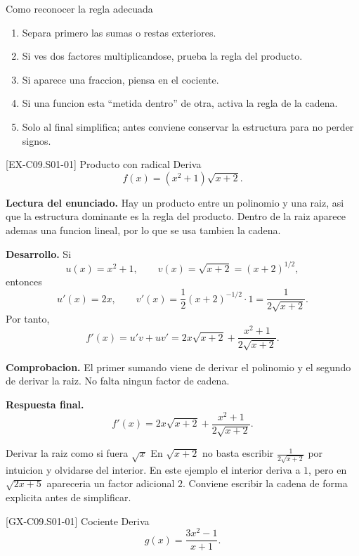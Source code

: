 \begin{methodbox}{Como reconocer la regla adecuada}
\begin{enumerate}
  \item Separa primero las sumas o restas exteriores.
  \item Si ves dos factores multiplicandose, prueba la regla del producto.
  \item Si aparece una fraccion, piensa en el cociente.
  \item Si una funcion esta ``metida dentro'' de otra, activa la regla de la cadena.
  \item Solo al final simplifica; antes conviene conservar la estructura para no perder signos.
\end{enumerate}
\end{methodbox}

\begin{solvedexample}{[EX-C09.S01-01] Producto con radical}
Deriva
\[
f(x)=(x^2+1)\sqrt{x+2}.
\]

\textbf{Lectura del enunciado.} Hay un producto entre un polinomio y una raiz, asi que la
estructura dominante es la regla del producto. Dentro de la raiz aparece ademas una funcion
lineal, por lo que se usa tambien la cadena.

\textbf{Desarrollo.} Si
\[
u(x)=x^2+1,\qquad v(x)=\sqrt{x+2}=(x+2)^{1/2},
\]
entonces
\[
u'(x)=2x,\qquad v'(x)=\frac{1}{2}(x+2)^{-1/2}\cdot 1=\frac{1}{2\sqrt{x+2}}.
\]
Por tanto,
\[
f'(x)=u'v+uv'=2x\sqrt{x+2}+\frac{x^2+1}{2\sqrt{x+2}}.
\]

\textbf{Comprobacion.} El primer sumando viene de derivar el polinomio y el segundo de derivar
la raiz. No falta ningun factor de cadena.

\textbf{Respuesta final.}
\[
f'(x)=2x\sqrt{x+2}+\frac{x^2+1}{2\sqrt{x+2}}.
\]
\end{solvedexample}

\begin{commonerror}{Derivar la raiz como si fuera \(\sqrt{x}\)}
En \(\sqrt{x+2}\) no basta escribir \(\frac{1}{2\sqrt{x+2}}\) por intuicion y olvidarse del
interior. En este ejemplo el interior deriva a \(1\), pero en \(\sqrt{2x+5}\) apareceria un
factor adicional \(2\). Conviene escribir la cadena de forma explicita antes de simplificar.
\end{commonerror}

\begin{guidedexercise}{[GX-C09.S01-01] Cociente}
Deriva
\[
g(x)=\frac{3x^2-1}{x+1}.
\]
\end{guidedexercise}

